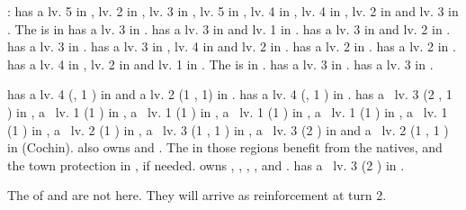:
\bparag \paysHollande has a \TradeFLEET lv. 5 in , lv. 2 in
, lv. 3 in , lv. 5 in , lv. 4 in
, lv. 4 in , lv. 2 in  and lv. 3 in
. The  is in \provinceVlaanderen
\bparag \paysecosse has a \TradeFLEET lv. 3 in .
\bparag \paysdanemark has a \TradeFLEET lv. 3 in  and lv. 1 in
.
\bparag \payshanse has a \TradeFLEET lv. 3 in  and lv. 2 in
.
\bparag \payssuede has a \TradeFLEET lv. 3 in .
\bparag \paysgenes has a \TradeFLEET lv. 3 in , lv. 4 in
 and lv. 2 in .
\bparag \paysoman has a \TradeFLEET lv. 2 in .
\bparag \paysaden has a \TradeFLEET lv. 2 in .
\bparag \paysgujarat has a \TradeFLEET lv. 4 in , lv. 2 in
 and lv. 1 in . The  is in \villeDiu.
\bparag \paysjapon has a \TradeFLEET lv. 3 in .
\bparag \payschine has a \TradeFLEET lv. 3 in .

\aparag[\ROTW]
\bparag \paysOman has a \COL lv. 4 (\constructionOman, 1 ) in
 and a \TP lv. 2 (1 , 1) in
\provinceZanzibar.
\bparag \paysAden has a \COL lv. 4 (\constructionAden, 1 ) in
.
\bparag \paysgujarat has a \TP\ lv. 3 (2 , 1 ) in
\provinceDiu, a \TP\ lv. 1 (1 ) in , a \TP\ lv. 1
(1 ) in , a \TP\ lv. 1 (1 ) in
, a \TP\ lv. 1 (1 ) in , a \TP\
lv. 1 (1 ) in \provinceOrmus, a \TP\ lv. 2 (1 ) in
\provinceMumbai, a \TP\ lv. 3 (1 , 1 ) in \provinceGoa, a
\TP\ lv. 3 (2 ) in \provinceKolikot and a \TP\ lv. 2 (1 \RES{PO},
1 \RES{Spices}) in \province{Malabar S} (Cochin).
\bparag \paysgujarat also owns \granderegionMalacca and
\granderegionGujarat. The \TP in those regions benefit from the natives, and
the town protection in \provinceDiu, if needed.
\bparag \paysvijayanagar owns \granderegionOrissa, \granderegionGondwana,
\granderegionKarnatika, \granderegionMalabar, \granderegionHyderabad and
\granderegionMumbai.
\bparag \paysSiberie has a \TP\ lv. 3 (2 ) in .

\aparag[Miscellaneous] [BLP]
\bparag The \corsaire of \paysCyrenaique and \paysTunisie are not here. They
will arrive as reinforcement at turn 2.

